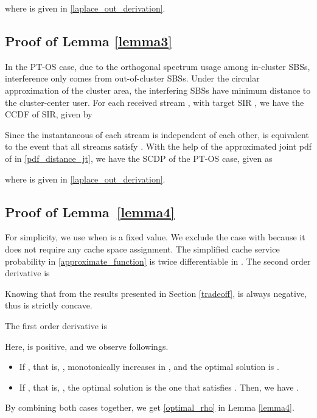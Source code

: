 \documentclass[twocolumns,10pt]{IEEEtran}
\begin{document}
where  is given in \eqref{laplace_out_derivation}.


\subsection{Proof of Lemma \ref{lemma3} }
\label{appen3}
In the PT-OS case, due to the orthogonal spectrum usage among in-cluster SBSs, interference only comes from out-of-cluster SBSs. Under the circular approximation  of the cluster area, the interfering SBSs have minimum distance  to the cluster-center user.
For each received stream , with target SIR , we have the CCDF of SIR, given by


Since the instantaneous  of each stream is independent of each other,   is equivalent to the event that all  streams satisfy . With the help of the approximated joint pdf of  in \eqref{pdf_distance_jt},  we have the SCDP of the PT-OS case, given as
  	
where  is given in \eqref{laplace_out_derivation}.

\subsection{Proof of Lemma~\ref{lemma4} }
\label{appen4}
For simplicity, we use  when  is a fixed value. We exclude the case with  because it does not require any cache space assignment. 
The simplified cache service probability  in \eqref{approximate_function} is twice differentiable in . The second order derivative is

Knowing that   from the results presented in Section \ref{tradeoff},  is always negative, thus  is strictly concave.

The first order derivative is

Here,  is positive, and we observe followings.
\begin{itemize}
	\item If , that is, ,  monotonically increases in , and the optimal solution is .
	\item If , that is, , the optimal solution is the one that satisfies . Then, we have .
\end{itemize}
By combining both cases together, we get \eqref{optimal_rho} in Lemma \ref{lemma4}.







	
	
\end{document}
